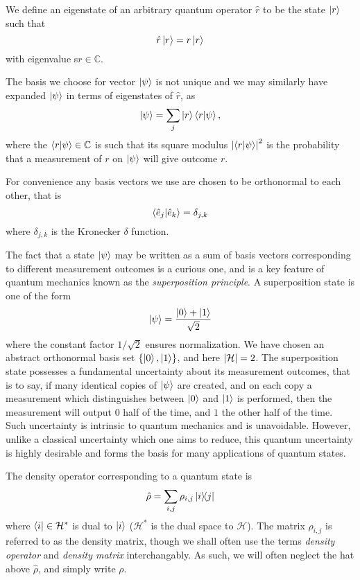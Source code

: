 \noindent We define an eigenstate of an arbitrary quantum operator $\hat{r}$ to be the state $\ket{r}$ such that
\begin{equation}
\hat{r} \ket{r} = r \ket{r}
\end{equation}
with eigenvalue s$r \in \mathbb{C}$.

The basis we choose for vector $\ket{\psi}$ is not unique and we may similarly have expanded $\ket{\psi}$ in terms of eigenstates of $\hat{r}$, as
\begin{equation}
\ket{\psi} = \sum_j \ket{r}\ip{r}{\psi},
\end{equation}
where the $\ip{r}{\psi} \in \mathbb{C}$ is such that its square modulus $\left|\ip{r}{\psi}\right|^2$ is the probability that a measurement of $r$ on $\ket{\psi}$ will give outcome $r$.

For convenience any basis vectors we use are chosen to be orthonormal to each other, that is
\begin{equation}
\ip{\hat{e}_j}{\hat{e}_k} = \delta_{j, k}
\end{equation}
where $\delta_{j, k}$ is the Kronecker $\delta$ function.

The fact that a state $\ket{\psi}$ may be written as a sum of basis vectors corresponding to different measurement outcomes is a curious one, and is a key feature of quantum mechanics known as the \emph{superposition principle}. A superposition state is one of the form
\begin{equation}\label{eqn:intro_superposition}
\ket{\psi} = \frac{\ket{0} + \ket{1}}{\sqrt{2}}
\end{equation}
where the constant factor $1/\sqrt{2}$ ensures normalization. We have chosen an abstract orthonormal basis set $\left\{ \ket{0}, \ket{1}\right\}$, and here $\left|\mathcal{H}\right|=2$. The superposition state possesses a fundamental uncertainty about its measurement outcomes, that is to say, if many identical copies of $\ket{\psi}$ are created, and on each copy a measurement which distinguishes between $\ket{0}$ and $\ket{1}$ is performed, then the measurement will output $0$ half of the time, and $1$ the other half of the time. Such uncertainty is intrinsic to quantum mechanics and is unavoidable. However, unlike a classical uncertainty which one aims to reduce, this quantum uncertainty is highly desirable and forms the basis for many applications of quantum states.

The density operator corresponding to a quantum state is
\begin{equation}
\hat{\rho} = \sum_{i, j} \rho_{i, j} \dyad{i}{j}
\end{equation}
where $\bra{i} \in \mathcal{H}^*$ is dual to $\ket{i}$ ($\mathcal{H}^*$ is the dual space to $\mathcal{H}$). The matrix $\rho_{i, j}$ is referred to as the density matrix, though we shall often use the terms \emph{density operator} and \emph{density matrix} interchangably. As such, we will often neglect the hat above $\hat{\rho}$, and simply write $\rho$.

